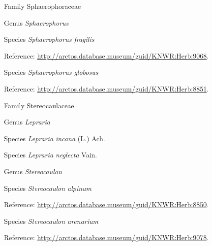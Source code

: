 \documentclass[9pt, article]{memoir}
\begin{document}
\begin{multicols}{2}
\vspace{6pt}\noindent\hspace{24pt}Family Sphaerophoraceae


\vspace{6pt}\noindent\hspace{30pt}Genus \textit{Sphaerophorus}


\vspace{6pt}\noindent\hspace{36pt}Species \textit{Sphaerophorus fragilis}


\vspace{6pt}Reference: 
\url{http://arctos.database.museum/guid/KNWR:Herb:9068}.

\vspace{6pt}\noindent\hspace{36pt}Species \textit{Sphaerophorus globosus}


\vspace{6pt}Reference: 
\url{http://arctos.database.museum/guid/KNWR:Herb:8851}.

\vspace{6pt}\noindent\hspace{24pt}Family Stereocaulaceae


\vspace{6pt}\noindent\hspace{30pt}Genus \textit{Lepraria}


\vspace{6pt}\noindent\hspace{36pt}Species \textit{Lepraria incana} (L.) Ach.


\vspace{6pt}\noindent\hspace{36pt}Species \textit{Lepraria neglecta} Vain.


\vspace{6pt}\noindent\hspace{30pt}Genus \textit{Stereocaulon}


\vspace{6pt}\noindent\hspace{36pt}Species \textit{Stereocaulon alpinum}


\vspace{6pt}Reference: 
\url{http://arctos.database.museum/guid/KNWR:Herb:8850}.

\vspace{6pt}\noindent\hspace{36pt}Species \textit{Stereocaulon arenarium}


\vspace{6pt}Reference: 
\url{http://arctos.database.museum/guid/KNWR:Herb:9078}.


\end{multicols}
\end{document}
